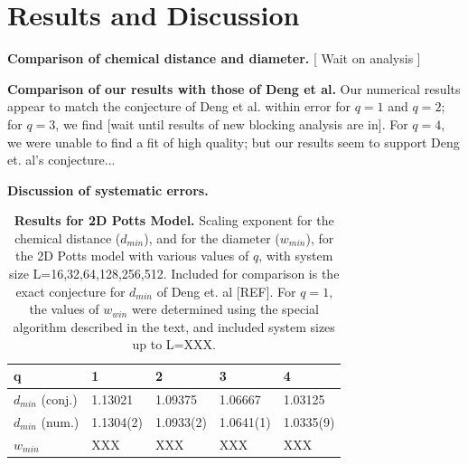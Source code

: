 \documentclass[pre,preprint,11pt]{revtex4}
\begin{document}


\section{Results and Discussion}


{\bf Comparison of chemical distance and diameter.}  [ Wait on analysis ]

{\bf Comparison of our results with those of Deng et al.} Our numerical results appear to match the conjecture of Deng et al. \cite{Deng2010} within error for $q=1$ and $q=2$; for $q=3$, we find [wait until results of new blocking analysis are in].  For $q=4$, we were unable to find a fit of high quality; but our results seem to support Deng et. al's conjecture...

{\bf Discussion of systematic errors.}









\begin{table}[h]
\begin{center}
\begin{tabular}{| l | l | l | l | l |}
\hline
q & 1 & 2 & 3 & 4 \\
\hline
$d_{min}$ (conj.) & 1.13021 & 1.09375 & 1.06667 & 1.03125 \\
\hline
$d_{min}$ (num.) & 1.1304(2) & 1.0933(2) & 1.0641(1) & 1.0335(9) \\
\hline
$w_{min}$ & XXX & XXX & XXX & XXX \\

\hline
\end{tabular}
\caption{\label{tab:dminD2d} {\bf Results for 2D Potts Model.} Scaling exponent for the chemical distance ($d_{min}$), and for the diameter ($w_{min}$), for the 2D Potts model with various values of $q$, with system size L=16,32,64,128,256,512.  Included for comparison is the exact conjecture for $d_{min}$ of Deng et. al [REF]. For $q=1$, the values of $w_{win}$ were determined using the special algorithm described in the text, and included system sizes up to L=XXX.}

\end{center}
\end{table}
\end{document}
